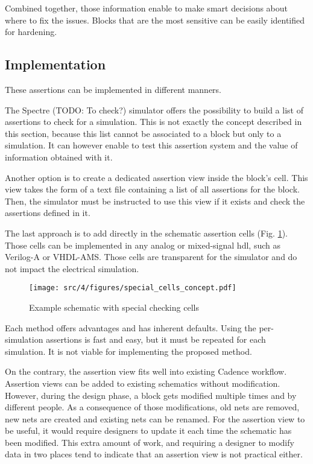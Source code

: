 Combined together, those information enable to make smart decisions about where to fix the issues.
Blocks that are the most sensitive can be easily identified for hardening.

\subsection{Implementation}

These assertions can be implemented in different manners.

The Spectre (TODO: To check?) simulator offers the possibility to build a list of assertions to check for a simulation.
This is not exactly the concept described in this section, because this list cannot be associated to a block but only to a simulation.
It can however enable to test this assertion system and the value of information obtained with it.

Another option is to create a dedicated assertion view inside the block's cell.
This view takes the form of a text file containing a list of all assertions for the block.
Then, the simulator must be instructed to use this view if it exists and check the assertions defined in it.

The last approach is to add directly in the schematic assertion cells (Fig. \ref{fig:ex-special-cells}).
Those cells can be implemented in any analog or mixed-signal \gls{hdl}, such as Verilog-A or VHDL-AMS.
Those cells are transparent for the simulator and do not impact the electrical simulation.


\begin{figure}[!h]
  \centering
  \texttt{[image: src/4/figures/special\_cells\_concept.pdf]}
  \caption{Example schematic with special checking cells}
  \label{fig:ex-special-cells}
\end{figure}

Each method offers advantages and has inherent defaults.
Using the per-simulation assertions is fast and easy, but it must be repeated for each simulation.
It is not viable for implementing the proposed method.

On the contrary, the assertion view fits well into existing Cadence workflow.
Assertion views can be added to existing schematics without modification.
However, during the design phase, a block gets modified multiple times and by different people.
As a consequence of those modifications, old nets are removed, new nets are created and existing nets can be renamed.
For the assertion view to be useful, it would require designers to update it each time the schematic has been modified.
This extra amount of work, and requiring a designer to modify data in two places tend to indicate that an assertion view is not practical either.

